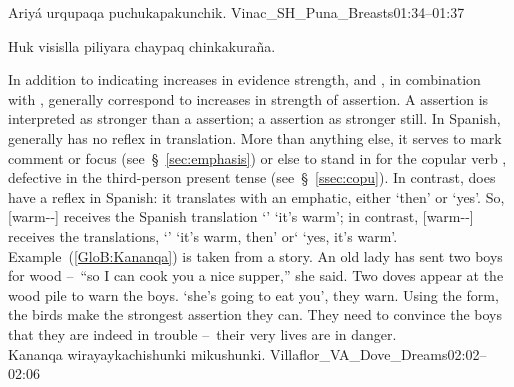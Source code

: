 %
{Ariyá urqupaqa puchukapakunchik.}%
{}%
{Vinac\_SH\_Puna\_Breasts}{01:34--01:37}%

%
{Huk visislla piliyara chaypaq chinkakuraña.}%
{}%
{}{}%

In addition to indicating increases in evidence strength,  and , in combination with , generally correspond to increases in strength of assertion. A  assertion is interpreted as stronger than a  assertion; a  assertion as stronger still. In Spanish,  generally has no reflex in translation. More than anything else, it serves to mark comment or focus (see~§~\ref{sec:emphasis}) or else to stand in for the copular verb , defective in the third-person present tense (see~§~\ref{ssec:copu}). In contrast,  does have a reflex in Spanish: it translates with an emphatic, either  ‘then’ or  ‘yes’. So,  [warm--\uo{}] receives the Spanish translation ‘’ ‘it’s warm’; in contrast,  [warm--] receives the translations, ‘’ ‘it’s warm, then’ or‘ ‘yes, it’s warm’. Example~(\ref{GloB:Kananqa}) is taken from a story. An old lady has sent two boys for wood --~“so I can cook you a nice supper,” she said. Two doves appear at the wood pile to warn the boys.  ‘she’s going to eat you’, they warn. Using the  form, the birds make the strongest assertion they can. They need to convince the boys that they are indeed in trouble --~their very lives are in danger.\\

%
{Kananqa wirayaykachishunki mikushunki.}%
{}%
{Villaflor\_VA\_Dove\_Dreams}{02:02--02:06}%

